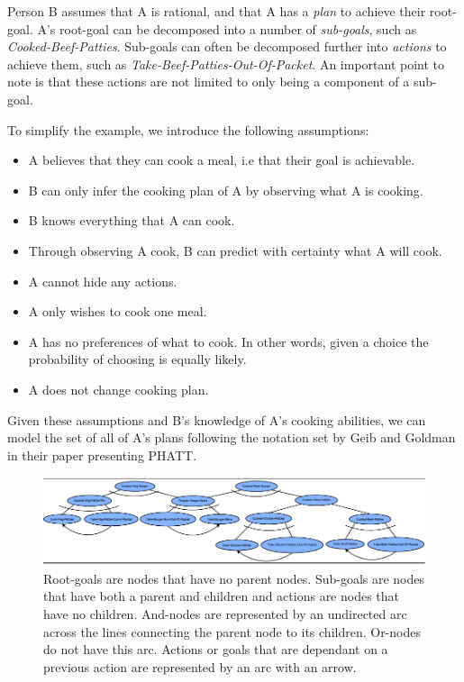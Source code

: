 \documentclass[parskip]{cs4rep}
\begin{document}
Person B assumes that A is rational, and that A has a \textit{plan} to achieve their root-goal. A's root-goal can be decomposed into a number of \textit{sub-goals}, such as \textit{Cooked-Beef-Patties}. Sub-goals can often be decomposed further into \textit{actions} to achieve them, such as \textit{Take-Beef-Patties-Out-Of-Packet}. An important point to note is that these actions are not limited to only being a component of a sub-goal. 

To simplify the example, we introduce the following assumptions:

\begin{itemize}
\item
A believes that they can cook a meal, i.e that their goal is achievable. 
\item
B can only infer the cooking plan of A by observing what A is cooking.
\item
B knows everything that A can cook. 
\item
Through observing A cook, B can predict with certainty what A will cook. 
\item
A cannot hide any actions.
\item
A only wishes to cook one meal.
\item
A has no preferences of what to cook. In other words, given a choice the probability of choosing is equally likely. 
\item
A does not change cooking plan.
\end{itemize}

Given these assumptions and B's knowledge of A's cooking abilities, we can model the set of all of A's plans following the notation set by Geib and Goldman in their paper presenting PHATT.

\begin{figure}[h]
\centerline{
	\includegraphics{images/example-plan-library.pdf}
}
\caption{Root-goals are nodes that have no parent nodes. Sub-goals are nodes that have both a parent and children and actions are nodes that have no children. And-nodes are represented by an undirected arc across the lines connecting the parent node to its children. Or-nodes do not have this arc. Actions or goals that are dependant on a previous action are represented by an arc with an arrow.}
\label{fig:example-plan-library}
\end{figure}
\end{document}
